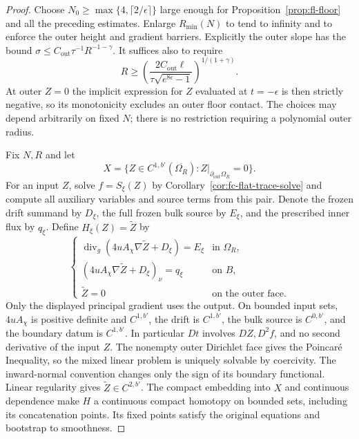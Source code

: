 \begin{proof}
Choose $N_0\ge\max\{4,\lceil2/\epsilon\rceil\}$ large enough
for Proposition~\ref{prop:fl-floor} and all the preceding
estimates.  Enlarge $R_{\min}(N)$ to tend to infinity and to
enforce the outer height and gradient barriers.  Explicitly the
outer slope has the bound
$\sigma\le C_{\mathrm{out}}\tau^{-1}R^{-1-\gamma}$.
It suffices also to require
\begin{equation}\label{eq:fc-outer-radius}
 R\ge\left(
 \frac{2C_{\mathrm{out}}\ell}
             {\tau\sqrt{e^{8\epsilon}-1}}\right)^{1/(1+\gamma)}.
\end{equation}
At outer $Z=0$ the implicit expression for $Z$ evaluated at
$t=-\epsilon$ is then strictly negative, so its monotonicity
excludes an outer floor contact.  The choices may depend
arbitrarily on fixed $N$; there is no restriction requiring a
polynomial outer radius.

Fix $N,R$ and let
\[
 X=\{Z\in C^{1,b'}(\overline{\Omega_R}):
                       Z|_{\partial_{\mathrm{out}}\Omega_R}=0\}.
\]
For an input $Z$, solve $f=S_\xi(Z)$ by
Corollary~\ref{cor:fc-flat-trace-solve} and compute all auxiliary
variables and source terms from this pair.  Denote the frozen
drift summand by $D_\xi$, the full frozen bulk source by
$E_\xi$, and the prescribed inner flux by $q_\xi$.
Define $H_\xi(Z)=\widetilde Z$ by
\begin{equation}\label{eq:fc-compact-map}
 \begin{cases}
 \operatorname{div}_g(4uA_\chi\nabla\widetilde Z+D_\xi)
                                      =E_\xi&\text{in }\Omega_R,\\
 (4uA_\chi\nabla\widetilde Z+D_\xi)_\nu=q_\xi&\text{on }B,\\
 \widetilde Z=0&\text{on the outer face}.
 \end{cases}
\end{equation}
Only the displayed principal gradient uses the output.
On bounded input sets, $4uA_\chi$ is positive definite and
$C^{1,b'}$, the drift is $C^{1,b'}$, the bulk source is $C^{0,b'}$,
and the boundary datum is $C^{1,b'}$.
In particular $Dt$ involves $DZ,D^2f$, and no second derivative
of the input $Z$.  The nonempty outer Dirichlet face gives the
Poincar\'e Inequality, so the mixed linear problem is uniquely
solvable by coercivity.  The inward-normal convention changes
only the sign of its boundary functional.  Linear regularity
gives $\widetilde Z\in C^{2,b'}$.  The compact embedding into
$X$ and continuous dependence make $H$ a continuous compact
homotopy on bounded sets, including its concatenation points.
Its fixed points satisfy the original equations and bootstrap
to smoothness.


\end{proof}
